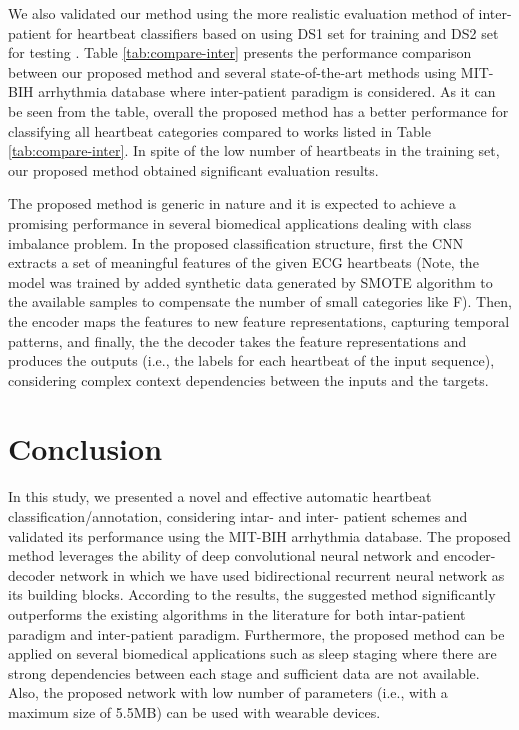 \documentclass{article}
\begin{document}
We also validated our method using the more realistic evaluation method of inter-patient for heartbeat classifiers based on using DS1 set for training and DS2 set for testing  \cite{de2004automatic,luz2016ecg}. Table \ref{tab:compare-inter} presents the performance comparison between our proposed method and several state-of-the-art methods using MIT-BIH arrhythmia database where inter-patient paradigm is considered. As it can be seen from the table, overall the proposed method has a better performance for classifying all heartbeat categories compared to works listed in Table \ref{tab:compare-inter}. In spite of the low number of  heartbeats in the training set, our proposed method obtained significant evaluation results.


The proposed method is generic in nature and it is expected to achieve a promising performance in several biomedical applications dealing with class imbalance problem. In the proposed classification structure, first the CNN extracts a set of meaningful features of the given ECG heartbeats (Note, the model was trained by added synthetic data generated by SMOTE algorithm to the available samples to compensate the number of small categories like F). Then, the encoder maps the features to new feature representations, capturing temporal patterns, and finally, the the decoder takes the feature representations and produces the outputs (i.e., the labels for each heartbeat of the input sequence), considering complex context dependencies between the inputs and the targets.

\section{Conclusion}
\label{sec:conc}
In this study, we  presented a novel and effective automatic heartbeat classification/annotation, considering intar- and inter- patient schemes and validated its performance using  the MIT-BIH arrhythmia database. The proposed method leverages the ability of deep convolutional neural network and encoder-decoder network in which we have used bidirectional recurrent neural network as its building blocks. According to the results, the suggested method significantly outperforms the existing algorithms in the literature for both intar-patient paradigm and inter-patient paradigm. Furthermore, the proposed method can be applied on several biomedical applications such as sleep staging where there are strong dependencies between each stage and sufficient data are not available. Also, the proposed network with low number of parameters (i.e., with a maximum size of 5.5MB) can be used with wearable devices.















\end{document}

